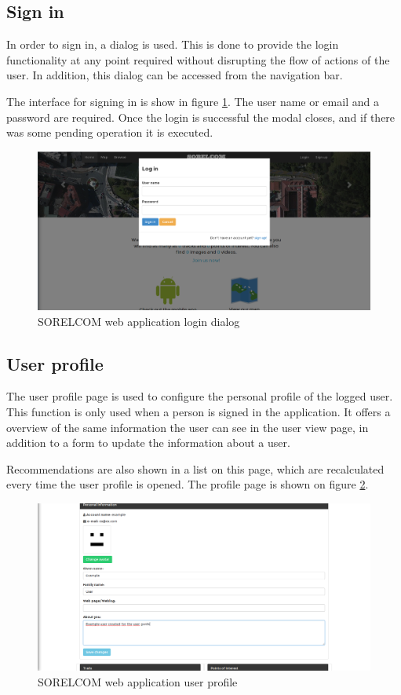 \subsection{Sign in}

In order to sign in, a dialog is used. This is done to provide the login functionality at any point required without disrupting the flow of actions of the user. In addition, this dialog can be accessed from the navigation bar.

The interface for signing in is show in figure \ref{fig:login}. The user name or email and a password are required. Once the login is successful the modal closes, and if there was some pending operation it is executed.

\begin{figure}[ht]
  \centering
  \includegraphics[width=.75\textwidth]{fig/login}
  \caption{SORELCOM web application login dialog}
  \label{fig:login}
\end{figure}

\subsection{User profile}

The user profile page is used to configure the personal profile of the logged user. This function is only used when a person is signed in the application. It offers a overview of the same information the user can see in the user view page, in addition to a form to update the information about a user.

Recommendations are also shown in a list on this page, which are recalculated every time the user profile is opened. The profile page is shown on figure \ref{fig:profile}.

\begin{figure}[ht]
  \centering
  \includegraphics[width=.75\textwidth]{fig/profile}
  \caption{SORELCOM web application user profile}
  \label{fig:profile}
\end{figure}


